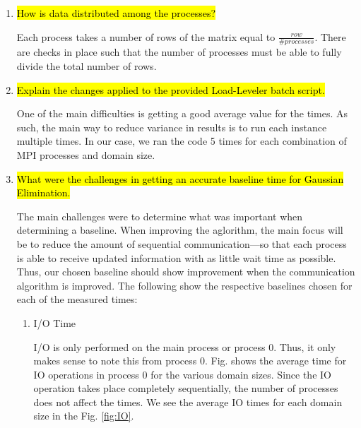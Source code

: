 \begin{enumerate}
We ran vampir on the baseline process to observe the blocking \verb!MPI_Send! and \verb!MPI_Recv! functions. This can be seen in Fig. \ref{fig:vampir_baseline}.

 \begin{figure}[h] %
 	\begin{center}
  		\texttt{[image: Baseline/vampir\_baseline.png]} %
  		\caption{Vampir Benchmark}
  		\label{fig:vampir_baseline}
  	\end{center}
 \end{figure}

	\item \hl{How is data distributed among the processes?}

	Each process takes a number of rows of the matrix equal to $\frac{row}{\#processes}$. There are checks in place such that the number of processes must be able to fully divide the total number of rows.

	\item \hl{Explain the changes applied to the provided Load-Leveler batch script.}

	One of the main difficulties is getting a good average value for the times. As such, the main way to reduce variance in results is to run each instance multiple times. In our case, we ran the code 5 times for each combination of MPI processes and domain size.

	\item \hl{What were the challenges in getting an accurate baseline time for Gaussian Elimination.}

	The main challenges were to determine what was important when determining a baseline. When improving the aglorithm, the main focus will be to reduce the amount of sequential communication---so that each process is able to receive updated information with as little wait time as possible. Thus, our chosen baseline should show improvement when the communication algorithm is improved. The following show the respective baselines chosen for each of the measured times:
\begin{enumerate}
	\item I/O Time

	I/O is only performed on the main process or process 0. Thus, it only makes sense to note this from process 0. Fig. shows the average time for IO operations in process 0 for the various domain sizes. Since the IO operation takes place completely sequentially, the number of processes does not affect the times. We see the average IO times for each domain size in the Fig. \ref{fig:IO}.
	

\end{enumerate}
\end{enumerate}
